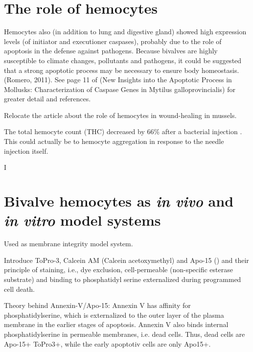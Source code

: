 \section{The role of hemocytes}
Hemocytes also (in addition to lung and digestive gland) showed high expression levels (of initiator and executioner caspases), probably due to the role of apoptosis in the defense against pathogens. Because bivalves are highly susceptible to climate changes, pollutants and pathogens, it  could be suggested that a strong apoptotic process may be necessary to ensure body homeostasis. (Romero, 2011). See page 11 of (New Insights into the Apoptotic Process in Mollusks: Characterization of Caspase Genes in Mytilus galloprovincialis) for greater detail and references.

Relocate the article about the role of hemocytes in wound-healing in mussels.

The total hemocyte count (THC) decreased by 66\% after a bacterial injection \cite{Parisi2008}. This could actually be to hemocyte aggregation in response to the needle injection itself.

I

\section{Bivalve hemocytes as \emph{in vivo} and \emph{in vitro} model systems}
Used as membrane integrity model system.

Introduce ToPro-3, Calcein AM (Calcein acetoxymethyl) and Apo-15 (\cite{Barth2020}) and their principle of staining, i.e., dye exclusion, cell-permeable (non-specific esterase substrate) and binding to phosphatidyl serine externalized during programmed cell death.

Theory behind Annexin-V/Apo-15: Annexin V
has affinity for phosphatidylserine, which is externalized to the
outer layer of the plasma membrane in the earlier stages of apoptosis. Annexin V also binds internal phosphatidylserine in permeable membranes, i.e. dead cells. Thus, dead cells are Apo-15+ ToPro3+, while the early apoptotiv cells are only Apo15+.